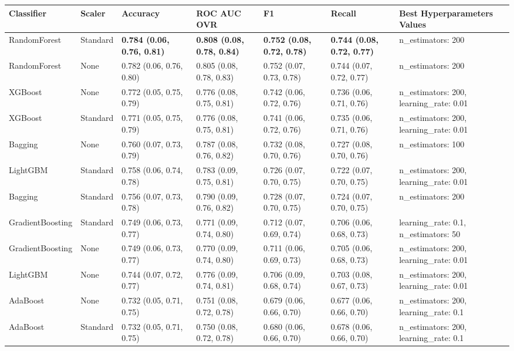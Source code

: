 \begin{tabular}{lllllll}
\toprule
Classifier & Scaler & Accuracy & ROC AUC OVR & F1 & Recall & Best Hyperparameters Values \\
\midrule
RandomForest & Standard & \textbf{0.784 (0.06, 0.76, 0.81)} & \textbf{0.808 (0.08, 0.78, 0.84)} & \textbf{0.752 (0.08, 0.72, 0.78)} & \textbf{0.744 (0.08, 0.72, 0.77)} & {{n\_estimators: 200}} \\
RandomForest & None & 0.782 (0.06, 0.76, 0.80) & 0.805 (0.08, 0.78, 0.83) & 0.752 (0.07, 0.73, 0.78) & 0.744 (0.07, 0.72, 0.77) & {{n\_estimators: 200}} \\
XGBoost & None & 0.772 (0.05, 0.75, 0.79) & 0.776 (0.08, 0.75, 0.81) & 0.742 (0.06, 0.72, 0.76) & 0.736 (0.06, 0.71, 0.76) & {{n\_estimators: 200, learning\_rate: 0.01}} \\
XGBoost & Standard & 0.771 (0.05, 0.75, 0.79) & 0.776 (0.08, 0.75, 0.81) & 0.741 (0.06, 0.72, 0.76) & 0.735 (0.06, 0.71, 0.76) & {{n\_estimators: 200, learning\_rate: 0.01}} \\
Bagging & None & 0.760 (0.07, 0.73, 0.79) & 0.787 (0.08, 0.76, 0.82) & 0.732 (0.08, 0.70, 0.76) & 0.727 (0.08, 0.70, 0.76) & {{n\_estimators: 100}} \\
LightGBM & Standard & 0.758 (0.06, 0.74, 0.78) & 0.783 (0.09, 0.75, 0.81) & 0.726 (0.07, 0.70, 0.75) & 0.722 (0.07, 0.70, 0.75) & {{n\_estimators: 200, learning\_rate: 0.01}} \\
Bagging & Standard & 0.756 (0.07, 0.73, 0.78) & 0.790 (0.09, 0.76, 0.82) & 0.728 (0.07, 0.70, 0.75) & 0.724 (0.07, 0.70, 0.75) & {{n\_estimators: 200}} \\
GradientBoosting & Standard & 0.749 (0.06, 0.73, 0.77) & 0.771 (0.09, 0.74, 0.80) & 0.712 (0.07, 0.69, 0.74) & 0.706 (0.06, 0.68, 0.73) & {{learning\_rate: 0.1, n\_estimators: 50}} \\
GradientBoosting & None & 0.749 (0.06, 0.73, 0.77) & 0.770 (0.09, 0.74, 0.80) & 0.711 (0.06, 0.69, 0.73) & 0.705 (0.06, 0.68, 0.73) & {{n\_estimators: 200, learning\_rate: 0.01}} \\
LightGBM & None & 0.744 (0.07, 0.72, 0.77) & 0.776 (0.09, 0.74, 0.81) & 0.706 (0.09, 0.68, 0.74) & 0.703 (0.08, 0.67, 0.73) & {{n\_estimators: 200, learning\_rate: 0.01}} \\
AdaBoost & None & 0.732 (0.05, 0.71, 0.75) & 0.751 (0.08, 0.72, 0.78) & 0.679 (0.06, 0.66, 0.70) & 0.677 (0.06, 0.66, 0.70) & {{n\_estimators: 200, learning\_rate: 0.1}} \\
AdaBoost & Standard & 0.732 (0.05, 0.71, 0.75) & 0.750 (0.08, 0.72, 0.78) & 0.680 (0.06, 0.66, 0.70) & 0.678 (0.06, 0.66, 0.70) & {{n\_estimators: 200, learning\_rate: 0.1}} \\

\end{tabular}
